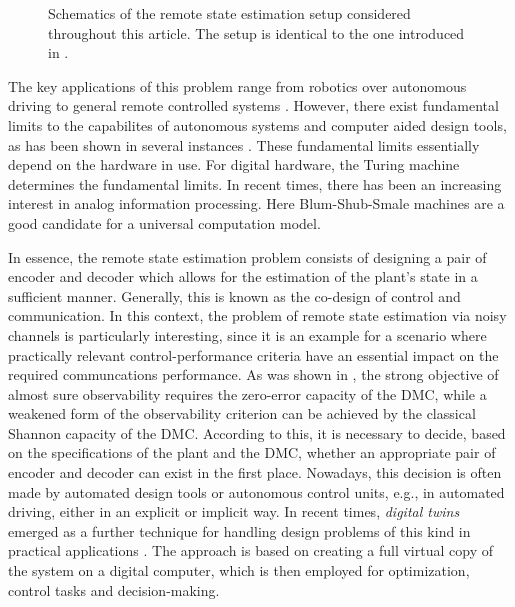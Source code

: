 \documentclass[conference]{IEEEtran}
\newcommand{\rys}{(\mathsf{y}_t)_{t\in\NN}}
\newcommand{\rshs}{(\hat{\mathsf{s}}_t)_{t\in\NN}}
\def\D{{\mathcal D}}
\def\NN{{\mathbb N}}
\newcommand{\tbr}[1]{}
\begin{document}
\begin{figure}
		\caption{Schematics of the remote state estimation setup considered throughout this article. The setup is identical to the one introduced in \cite{BoBoDe21}\tbr{{\color{red}\(\leftarrow\) Change to TAC!~}}.}
		\label{fig:Schematics}
	\end{figure}
	The key applications of this problem range from robotics over autonomous driving to general remote controlled systems \cite{FeBo21}. However, there exist fundamental 
	limits to the capabilites of autonomous systems and computer aided design tools, as has been shown in several instances \cite{BoBoDe21}\tbr{{\color{red}\(\leftarrow\) Check this source!~}}. These fundamental limits essentially
	depend on the hardware in use. For digital hardware, the Turing machine determines the fundamental limits. In recent times, there has been an increasing interest in analog information processing.
	Here Blum-Shub-Smale machines are a good candidate for a universal computation model.
	
	In essence, the remote state estimation problem consists of designing a pair of encoder and decoder which allows for the estimation of the plant's state in a sufficient manner.
	Generally, this is known as the co-design of control and communication. In this context, the problem of remote state estimation via noisy channels is particularly interesting,
	since it is an example for a scenario where practically relevant control-performance criteria have an essential impact on the required communcations performance.
	As was shown in \cite{MS07}, the strong objective of almost sure observability requires the zero-error capacity of the DMC, while a weakened form of the observability criterion can be achieved
	by the classical Shannon capacity of the DMC.
	According to this, it is necessary to decide, based on the specifications of the plant and the DMC, whether an appropriate pair of encoder and decoder can exist in the first place. 
	Nowadays, this decision is often made by automated design tools or autonomous control units, e.g., in automated driving, either in an explicit or implicit way. In recent times, 
	\emph{digital twins} emerged as a further technique for handling design problems of this kind in practical applications \cite{RaSaKv20,TaZhLiNe19}. 
	The approach is based on creating a full virtual copy of the system on a digital computer, which is then employed for optimization, control tasks and decision-making. 
\end{document}
